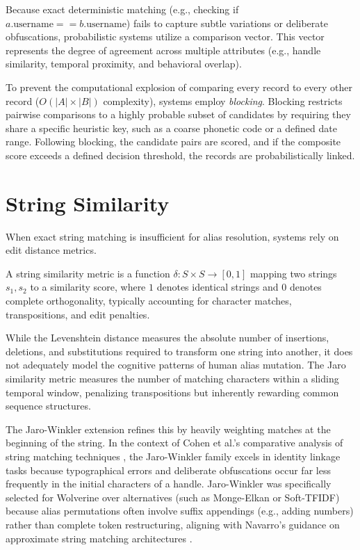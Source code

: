 Because exact deterministic matching (e.g., checking if $a\text{.username} == b\text{.username}$) fails to capture subtle variations or deliberate obfuscations, probabilistic systems utilize a comparison vector. This vector represents the degree of agreement across multiple attributes (e.g., handle similarity, temporal proximity, and behavioral overlap).

To prevent the computational explosion of comparing every record to every other record ($O(|A| \times |B|)$ complexity), systems employ \textit{blocking}. Blocking restricts pairwise comparisons to a highly probable subset of candidates by requiring they share a specific heuristic key, such as a coarse phonetic code or a defined date range. Following blocking, the candidate pairs are scored, and if the composite score exceeds a defined decision threshold, the records are probabilistically linked.

\section{String Similarity}
\label{sec:foundations-string-similarity}
When exact string matching is insufficient for alias resolution, systems rely on edit distance metrics. 

\begin{definition}
\label{def:string-similarity}
A string similarity metric is a function $\delta: S \times S \rightarrow [0,1]$ mapping two strings $s_1, s_2$ to a similarity score, where $1$ denotes identical strings and $0$ denotes complete orthogonality, typically accounting for character matches, transpositions, and edit penalties.
\end{definition}

While the Levenshtein distance measures the absolute number of insertions, deletions, and substitutions required to transform one string into another, it does not adequately model the cognitive patterns of human alias mutation. The Jaro similarity metric \cite{jaro1989advances} measures the number of matching characters within a sliding temporal window, penalizing transpositions but inherently rewarding common sequence structures. 

The Jaro-Winkler extension \cite{winkler1990string} refines this by heavily weighting matches at the beginning of the string. In the context of Cohen et al.'s comparative analysis of string matching techniques \cite{cohen2003comparison}, the Jaro-Winkler family excels in identity linkage tasks because typographical errors and deliberate obfuscations occur far less frequently in the initial characters of a handle. Jaro-Winkler was specifically selected for Wolverine over alternatives (such as Monge-Elkan or Soft-TFIDF) because alias permutations often involve suffix appendings (e.g., adding numbers) rather than complete token restructuring, aligning with Navarro's guidance on approximate string matching architectures \cite{navarro2001guided}.

